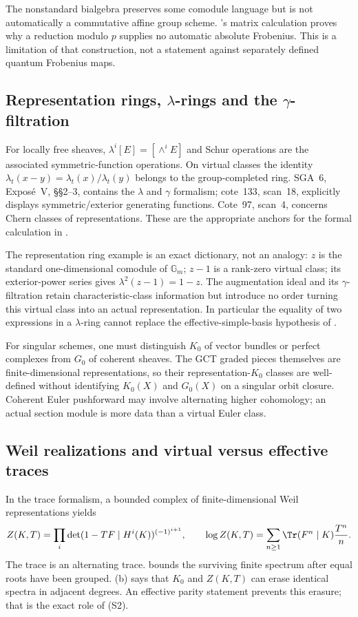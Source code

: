 The nonstandard bialgebra preserves some comodule language but is not automatically a commutative affine group scheme. 's matrix calculation proves why a reduction modulo $p$ supplies no automatic absolute Frobenius. This is a limitation of that construction, not a statement against separately defined quantum Frobenius maps.

\subsection{Representation rings, $\lambda$-rings and the $\gamma$-filtration}
For locally free sheaves, $\lambda^i[E]=[\wedge^iE]$ and Schur operations are the associated symmetric-function operations. On virtual classes the identity $\lambda_t(x-y)=\lambda_t(x)/\lambda_t(y)$ belongs to the group-completed ring. SGA~6, Expos\'e~V, \S\S2--3, contains the $\lambda$ and $\gamma$ formalism; cote~133, scan~18, explicitly displays symmetric/exterior generating functions. Cote~97, scan~4, concerns Chern classes of representations. These are the appropriate anchors for the formal calculation in .

The representation ring example is an exact dictionary, not an analogy: $z$ is the standard one-dimensional comodule of $\mathbb G_m$; $z-1$ is a rank-zero virtual class; its exterior-power series gives $\lambda^2(z-1)=1-z$. The augmentation ideal and its $\gamma$-filtration retain characteristic-class information but introduce no order turning this virtual class into an actual representation. In particular the equality of two expressions in a $\lambda$-ring cannot replace the effective-simple-basis hypothesis of .

For singular schemes, one must distinguish $K_0$ of vector bundles or perfect complexes from $G_0$ of coherent sheaves. The GCT graded pieces themselves are finite-dimensional representations, so their representation-$K_0$ classes are well-defined without identifying $K_0(X)$ and $G_0(X)$ on a singular orbit closure. Coherent Euler pushforward may involve alternating higher cohomology; an actual section module is more data than a virtual Euler class.

\subsection{Weil realizations and virtual versus effective traces}
In the trace formalism, a bounded complex of finite-dimensional Weil representations yields
\[
 Z(K,T)=\prod_i\det(1-TF\mid H^i(K))^{(-1)^{i+1}},\qquad
 \log Z(K,T)=\sum_{n\ge1}\Tr(F^n\mid K)\frac{T^n}{n}.
\]
The trace is an alternating trace.  bounds the surviving finite spectrum after equal roots have been grouped. (b) says that $K_0$ and $Z(K,T)$ can erase identical spectra in adjacent degrees. An effective parity statement prevents this erasure; that is the exact role of (S2).

